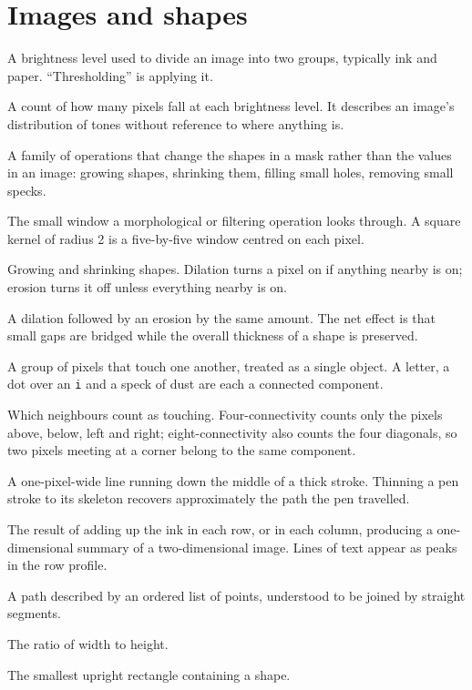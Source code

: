 \section{Images and shapes}
\begin{description}[style=nextline,leftmargin=1.4em]
  \item[Threshold] A brightness level used to divide an image into two
        groups, typically ink and paper. ``Thresholding'' is applying it.
  \item[Histogram] A count of how many pixels fall at each brightness level.
        It describes an image's distribution of tones without reference to
        where anything is.
  \item[Morphology] A family of operations that change the shapes in a mask
        rather than the values in an image: growing shapes, shrinking them,
        filling small holes, removing small specks.
  \item[Structuring element, or kernel] The small window a morphological or
        filtering operation looks through. A square kernel of radius 2 is a
        five-by-five window centred on each pixel.
  \item[Dilation and erosion] Growing and shrinking shapes. Dilation turns a
        pixel on if anything nearby is on; erosion turns it off unless
        everything nearby is on.
  \item[Closing] A dilation followed by an erosion by the same amount. The
        net effect is that small gaps are bridged while the overall thickness
        of a shape is preserved.
  \item[Connected component] A group of pixels that touch one another,
        treated as a single object. A letter, a dot over an \texttt{i} and a
        speck of dust are each a connected component.
  \item[Connectivity] Which neighbours count as touching. Four-connectivity
        counts only the pixels above, below, left and right;
        eight-connectivity also counts the four diagonals, so two pixels
        meeting at a corner belong to the same component.
  \item[Skeleton, or centreline] A one-pixel-wide line running down the
        middle of a thick stroke. Thinning a pen stroke to its skeleton
        recovers approximately the path the pen travelled.
  \item[Projection profile] The result of adding up the ink in each row, or
        in each column, producing a one-dimensional summary of a
        two-dimensional image. Lines of text appear as peaks in the row
        profile.
  \item[Polyline] A path described by an ordered list of points, understood
        to be joined by straight segments.
  \item[Aspect ratio] The ratio of width to height.
  \item[Bounding box] The smallest upright rectangle containing a shape.
\end{description}

